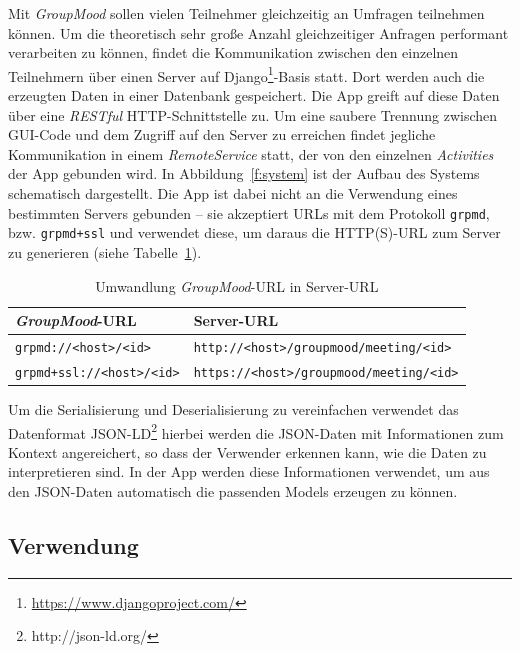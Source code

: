 Mit \emph{GroupMood} sollen vielen Teilnehmer gleichzeitig an Umfragen teilnehmen können. Um die theoretisch sehr große Anzahl gleichzeitiger Anfragen performant verarbeiten zu können, findet die Kommunikation zwischen den einzelnen Teilnehmern über einen Server auf Django\footnote{\url{https://www.djangoproject.com/}}-Basis statt. Dort werden auch die erzeugten Daten in einer Datenbank gespeichert. Die App greift auf diese Daten über eine \emph{RESTful} HTTP-Schnittstelle zu. Um eine saubere Trennung zwischen GUI-Code und dem Zugriff auf den Server zu erreichen findet jegliche Kommunikation in einem \emph{RemoteService} statt, der von den einzelnen \emph{Activities} der App gebunden wird. In Abbildung~\ref{f:system}  ist der Aufbau des Systems schematisch dargestellt. Die App ist dabei nicht an die Verwendung eines bestimmten Servers gebunden -- sie akzeptiert URLs mit dem Protokoll \texttt{grpmd}, bzw. \texttt{grpmd+ssl} und verwendet diese, um daraus die HTTP(S)-URL zum Server zu generieren (siehe Tabelle~\ref{table:urlschema}).

\begin{table}[htb]
\begin{center}
\begin{tabular}{l l}
\emph{GroupMood}-URL & Server-URL \\
\hline
\texttt{grpmd://<host>/<id>} & \texttt{http://<host>/groupmood/meeting/<id>} \\
\texttt{grpmd+ssl://<host>/<id>} & \texttt{https://<host>/groupmood/meeting/<id>} \\
\end{tabular}
\caption{Umwandlung \emph{GroupMood}-URL in Server-URL}
\label{table:urlschema}
\end{center}
\end{table}

Um die Serialisierung und Deserialisierung zu vereinfachen verwendet das Datenformat JSON-LD\footnote{http://json-ld.org/} hierbei werden die JSON-Daten mit Informationen zum Kontext angereichert, so dass der Verwender erkennen kann, wie die Daten zu interpretieren sind. In der App werden diese Informationen verwendet, um aus den JSON-Daten automatisch die passenden Models erzeugen zu können.

\subsection{Verwendung}

